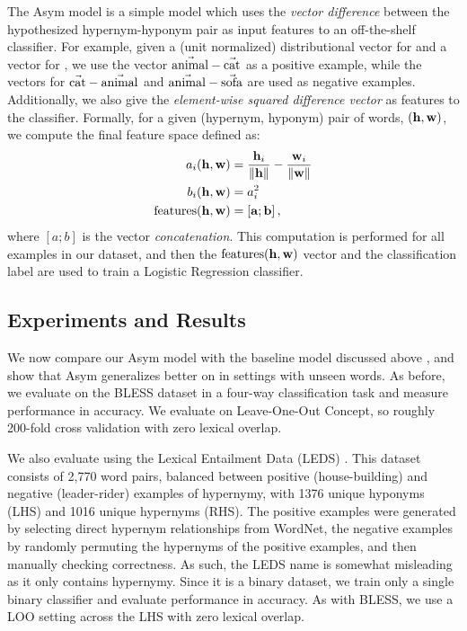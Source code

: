 The Asym model is a simple model which uses the {\em vector difference} between
the hypothesized hypernym-hyponym pair as input features to an off-the-shelf
classifier. For example, given a (unit normalized) distributional vector for
 and a vector for , we use the vector
$\vec{\mbox{animal}} - \vec{\mbox{cat}}$ as a positive example, while the
vectors for $\vec{\mbox{cat}} - \vec{\mbox{animal}}$ and
$\vec{\mbox{animal}} - \vec{\mbox{sofa}}$ are used as negative examples. Additionally,
we also give the {\em element-wise squared difference vector} as features to
the classifier. Formally, for a given (hypernym, hyponym) pair of words,
$({\mathbf{h}}, {\mathbf{w}})$, we compute the final feature space defined as:
\begin{align}
\begin{split}
  a_i({\mathbf{h}}, {\mathbf{w}}) & = \frac{{\mathbf{h}}_i}{\lVert {\mathbf{h}} \rVert} - \frac{{\mathbf{w}}_i}{\lVert {\mathbf{w}} \rVert}\\
  b_i({\mathbf{h}}, {\mathbf{w}}) & = a_i^2\\
  \mbox{features}({\mathbf{h}}, {\mathbf{w}}) & = \left[{\mathbf{a}}; {\mathbf{b}}\right],
\end{split}
\label{eqn:asym}
\end{align}
where $[a; b]$ is the vector {\em concatenation}. This computation
is performed for all examples in our dataset, and then the $\mbox{features}({\mathbf{h}}, {\mathbf{w}})$
vector and the classification label are used to train a Logistic Regression
classifier.

\subsection{Experiments and Results}

We now compare our Asym model with the baseline model discussed above
\cite{baroni:2012:eacl}, and show that Asym generalizes better on in settings
with unseen words. As before, we evaluate on the BLESS dataset in a four-way
classification task and measure performance in accuracy. We evaluate on
Leave-One-Out Concept, so roughly 200-fold cross validation with zero lexical
overlap.

We also evaluate using the Lexical Entailment Data (LEDS)
\cite{baroni:2012:eacl}. This dataset consists of 2,770 word pairs, balanced
between positive (house-building) and negative (leader-rider) examples of
hypernymy, with 1376 unique hyponyms (LHS) and 1016 unique hypernyms (RHS). The
positive examples were generated by selecting direct hypernym relationships
from WordNet, the negative examples by randomly permuting the hypernyms of the
positive examples, and then manually checking correctness. As such, the LEDS
name is somewhat misleading as it only contains hypernymy. Since it is a binary
dataset, we train only a single binary classifier and evaluate performance in
accuracy. As with BLESS, we use a LOO setting across the LHS with zero lexical
overlap.

